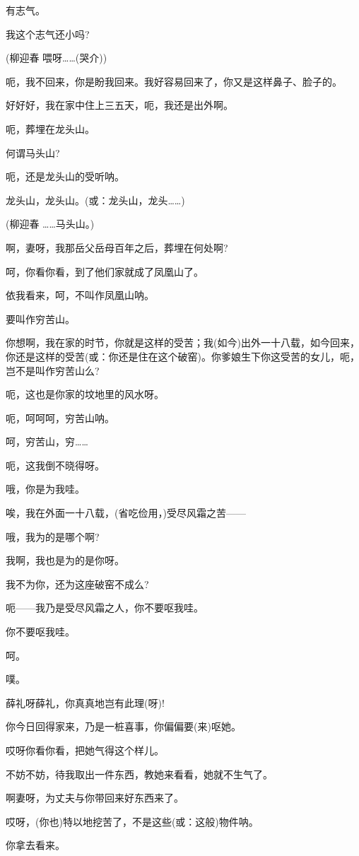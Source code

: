有志气。

我这个志气还小吗?

(柳迎春 喂呀\ldots{}\ldots{}(哭介))

呃，我不回来，你是盼我回来。我好容易回来了，你又是这样鼻子、脸子的。

好好好，我在家中住上三五天，呃，我还是出外啊。

呃，葬埋在龙头山。

何谓马头山?

呃，还是龙头山的受听呐。

龙头山，龙头山。(或：龙头山，龙头\ldots{}\ldots{})

(柳迎春 \ldots{}\ldots{}马头山。)

啊，妻呀，我那岳父岳母百年之后，葬埋在何处啊?

呵，你看你看，到了他们家就成了凤凰山了。

依我看来，呵，不叫作凤凰山呐。

要叫作穷苦山。

你想啊，我在家的时节，你就是这样的受苦；我(如今)出外一十八载，如今回来，你还是这样的受苦(或：你还是住在这个破窑)。你爹娘生下你这受苦的女儿，呃，岂不是叫作穷苦山么?

呃，这也是你家的坟地里的风水呀。

呃，呵呵呵，穷苦山呐。

呵，穷苦山，穷\ldots{}\ldots{}

呃，这我倒不晓得呀。

哦，你是为我哇。

唉，我在外面一十八载，(省吃俭用，)受尽风霜之苦------

哦，我为的是哪个啊?

我啊，我也是为的是你呀。

我不为你，还为这座破窑不成么?

呃------我乃是受尽风霜之人，你不要呕我哇。

你不要呕我哇。

呵。

噗。

薛礼呀薛礼，你真真地岂有此理(呀)!

你今日回得家来，乃是一桩喜事，你偏偏要(来)呕她。

哎呀你看你看，把她气得这个样儿。

不妨不妨，待我取出一件东西，教她来看看，她就不生气了。

啊妻呀，为丈夫与你带回来好东西来了。

哎呀，(你也)特以地挖苦了，不是这些(或：这般)物件呐。

你拿去看来。

